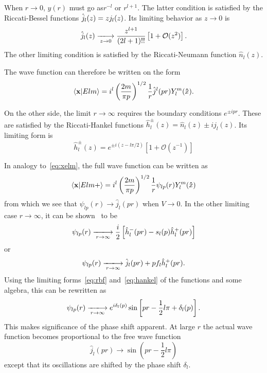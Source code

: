 When \(r\to 0\), \(y(r)\) must go as\(r^{-l}\) or \(r^{l+1}\). The latter
condition is satisfied by the
Riccati-Bessel functions \(\hat{j}_l(z){} = zj_{l}(z)\). Its limiting behavior as \(z\to
0\) is
\begin{equation}
  \label{eq:rbf}
  \rbf{} \xlongrightarrow[z\to 0]{} \frac{z^{l+1}}{(2l+1)!!}\left[ 1+\mathcal{O}(z^{2}) \right].
\end{equation}
The other limiting condition is satisfied by the Riccati-Neumann function
\(\hat{n}_{l}(z)\). 

The wave function can therefore be written on the form
\begin{equation}
  \label{eq:xelm}
  \ip{\vb{x}}{Elm} = i^{l}\left( \frac{2m}{\pi p} \right)^{1/2}\frac{1}{r}\hat{j}^{l}(pr)Y^{m}_{l}(\vu{x}).
\end{equation}

On the other side, the limit \(r\to\infty\) requires the boundary conditions
\(e^{\pm ipr}\). These are satisfied by the Riccati-Hankel functions
\(\hat{h}_{l}^{\pm}(z) = \hat{n}_{l}(z) \pm ij_{l}(z)\). Its limiting form is
\begin{equation}
  \label{eq:hankel}
  \hat{h}^{\pm}_{l}(z) = e^{\pm i\left( z-l\pi/2 \right)}\left[ 1+\mathcal{O}(z^{-1}) \right]
\end{equation}

In analogy to~\eqref{eq:xelm}, the full wave function can be written as
\begin{equation*}
  \ip{\vb{x}}{Elm+} = i^{l}\left( \frac{2m}{\pi p} \right)^{1/2}\frac{1}{r}\psi_{lp}(r)Y^{m}_{l}(\vu{x})
\end{equation*}
from which we see that \(\psi_{lp}(r)\to\hat{j}_{l}(pr)\) when \(V\to 0\). In
the other limiting case \(r\to \infty\), it can be shown~\cite[p.~187]{taylor} to be
\begin{equation}
  \label{eq:psi}
  \psi_{lp}(r)   \xlongrightarrow[r\to \infty]{} \frac{i}{2}\left[\hat{h}^{-}_{l}(pr) - s_{l}(p)\hat{h}^{+}_{l}(pr)\right]
\end{equation}
or
\begin{equation*}
  \psi_{lp}(r)   \xlongrightarrow[r\to \infty]{} \hat{j}_{l}(pr)+pf_{l}\hat{h}^{+}_{l}(pr).
\end{equation*}
Using the limiting forms~\eqref{eq:rbf} and~\eqref{eq:hankel} of the functions and some algebra, this can be
rewritten as
\begin{equation*}
  \psi_{lp}(r)   \xlongrightarrow[r\to \infty]{} e^{i\delta_{l}(p)}\sin\left[ pr - \frac{1}{2}l\pi+\delta_{l}(p) \right].
\end{equation*}
This makes significance of the phase shift apparent. At large \(r\) the actual
wave function becomes proportional to the free wave function
\begin{equation*}
  \hat{j}_{l}(pr)\to\sin\left( pr-\frac{1}{2}l\pi \right)
\end{equation*}
except that its oscillations are shifted by the phase shift \(\delta_{l}\).


